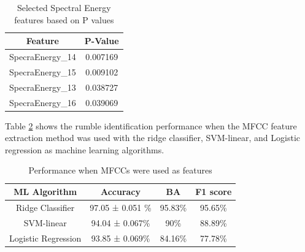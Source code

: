 \documentclass[applsci,article,accept,moreauthors,pdftex]{Definitions/mdpi}
\begin{document}
\begin{table}[t!]
\centering
\begin{tabular}{|c|c|}
\hline
\textbf{Feature} & \textbf{P-Value} \\
\hline
SpecraEnergy\_14 & 0.007169 \\
\hline
SpecraEnergy\_15 & 0.009102 \\
\hline
SpecraEnergy\_13 & 0.038727 \\
\hline
SpecraEnergy\_16 & 0.039069 \\
\hline
\end{tabular}
\caption{Selected Spectral Energy features based on P values}
\label{Spectral_P_Value}
\end{table}

Table \ref{tab_MFCC} shows the rumble identification performance when the MFCC feature extraction method was used with the ridge classifier, SVM-linear, and Logistic regression as machine learning algorithms.

\begin{table}[h]
	\centering
	\begin{tabular}{|c|c|c|c|}
		\hline
		\textbf{ML Algorithm} & \textbf{Accuracy} & \textbf{BA} & \textbf{F1 score} \\
		\hline
		Ridge Classifier & 97.05 ± 0.051 \% & 95.83\% & 95.65\% \\
		\hline
		SVM-linear & 94.04 ± 0.067\% & 90\% & 88.89\% \\
		\hline
		Logistic Regression & 93.85  ± 0.069\% & 84.16\% & 77.78\% \\
		\hline
	\end{tabular}
	\caption{Performance when MFCCs were used as features}
	\label{tab_MFCC}
\end{table}
\end{document}
